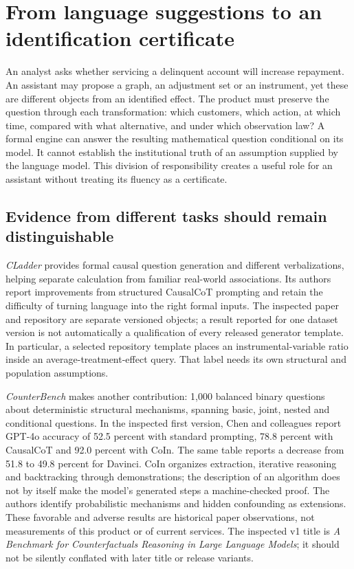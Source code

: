 \section{From language suggestions to an identification certificate}
\label{exec14:llm-identification}

An analyst asks whether servicing a delinquent account will increase repayment.
An assistant may propose a graph, an adjustment set or an instrument, yet these
are different objects from an identified effect. The product must preserve the
question through each transformation: which customers, which action, at which
time, compared with what alternative, and under which observation law? A formal
engine can answer the resulting mathematical question conditional on its model.
It cannot establish the institutional truth of an assumption supplied by the
language model. This division of responsibility creates a useful role for an
assistant without treating its fluency as a certificate. \citep{exec14_ident_contract}

\subsection{Evidence from different tasks should remain distinguishable}

\emph{CLadder} provides formal causal question generation and different
verbalizations, helping separate calculation from familiar real-world
associations. Its authors report improvements from structured CausalCoT
prompting and retain the difficulty of turning language into the right formal
inputs. The inspected paper and repository are separate versioned objects; a
result reported for one dataset version is not automatically a qualification of
every released generator template. In particular, a selected repository template
places an instrumental-variable ratio inside an average-treatment-effect query.
That label needs its own structural and population assumptions.
\citep{v12_la_2312_04350,exec14_ident_packages}

\emph{CounterBench} makes another contribution: 1,000 balanced binary questions
about deterministic structural mechanisms, spanning basic, joint, nested and
conditional questions. In the inspected first version, Chen and colleagues report
GPT-4o accuracy of 52.5 percent with standard prompting, 78.8 percent with
CausalCoT and 92.0 percent with CoIn. The same table reports a decrease from
51.8 to 49.8 percent for Davinci. CoIn organizes extraction, iterative reasoning
and backtracking through demonstrations; the description of an algorithm does
not by itself make the model's generated steps a machine-checked proof. The
authors identify probabilistic mechanisms and hidden confounding as extensions.
These favorable and adverse results are historical paper observations, not
measurements of this product or of current services. The inspected v1 title is
\emph{A Benchmark for Counterfactuals Reasoning in Large Language Models}; it
should not be silently conflated with later title or release variants.
\citep{exec14_ident_counterbench}

